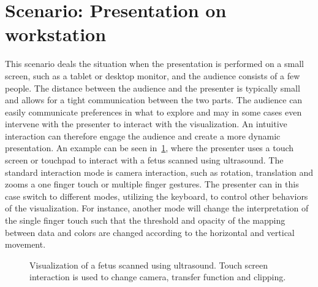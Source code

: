 \documentclass[review,journal]{vgtc}         %
\begin{document}
\section{Scenario: Presentation on workstation}

This scenario deals the situation when the presentation is performed on a small screen, such as a tablet or desktop monitor, and the audience consists of a few people. 
The distance between the audience and the presenter is typically small and allows for a tight communication between the two parts. The audience can easily communicate preferences in what to explore and may in some cases even intervene with the presenter to interact with the visualization. An intuitive interaction can therefore engage the audience and create a more dynamic presentation. An example can be seen in~\cref{img:touch_workstation}, where the presenter uses a touch screen or touchpad to interact with a fetus scanned using ultrasound. The standard interaction mode is camera interaction, such as rotation, translation and zooms a one finger touch or multiple finger gestures. The presenter can in this case switch to different modes, utilizing the keyboard, to control other behaviors of the visualization. For instance, another mode will change the interpretation of the single finger touch such that the threshold and opacity of the mapping between data and colors are changed according to the horizontal and vertical movement.

%
%
%
%

\begin{figure}[htb]
	\centering
	\caption{Visualization of a fetus scanned using ultrasound. Touch screen interaction is used to change camera, transfer function and clipping.}
	\label{img:touch_workstation}
\end{figure}
\end{document}
